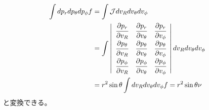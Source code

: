 \begin{align}
	\int dp_r dp_{\theta} dp_{\phi}f &= \int \mathcal{J} dv_R dv_{\theta} dv_{\phi}\\
	&=
	\int
	\left|
	\begin{array}{ccc}
	 	\cfrac{\partial p_r}{\partial v_R} & \cfrac{\partial p_r}{\partial v_{\theta}} & \cfrac{\partial p_r}{\partial v_{\phi}}\\
		\cfrac{\partial p_{\theta}}{\partial v_R} & \cfrac{\partial p_{\theta}}{\partial v_{\theta}} & \cfrac{\partial p_{\theta}}{\partial v_{\phi}}\\
		\cfrac{\partial p_{\phi}}{\partial v_R} & \cfrac{\partial p_{\phi}}{\partial v_{\theta}} & \cfrac{\partial p_{\phi}}{\partial v_{\phi}}
	\end{array}
	\right| 
	 dv_R dv_{\theta} dv_{\phi}\\
	&= r^2\sin\theta \int dv_R dv_{\theta} dv_{\phi}f = r^2 \sin\theta \nu    \label{integral}
\end{align}
と変換できる。

